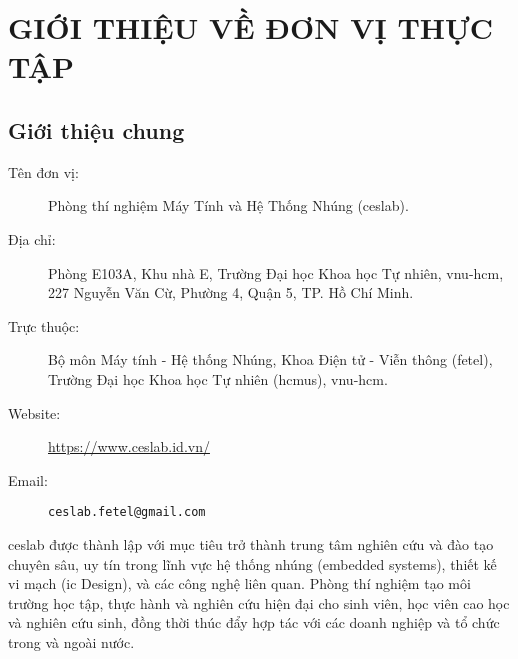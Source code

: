 

\chapter{GIỚI THIỆU VỀ ĐƠN VỊ THỰC TẬP}
\label{Chapter1} %

\section{Giới thiệu chung}
\label{subsec:ceslab_general}

\begin{description}
    \item[Tên đơn vị:] Phòng thí nghiệm Máy Tính và Hệ Thống Nhúng (\acrshort{ceslab}).
    \item[Địa chỉ:] Phòng E103A, Khu nhà E, Trường Đại học Khoa học Tự nhiên, \acrshort{vnu-hcm}, 227 Nguyễn Văn Cừ, Phường 4, Quận 5, TP. Hồ Chí Minh.
    \item[Trực thuộc:] Bộ môn Máy tính - Hệ thống Nhúng, Khoa Điện tử - Viễn thông (\acrshort{fetel}), Trường Đại học Khoa học Tự nhiên (\acrshort{hcmus}), \acrshort{vnu-hcm}.
    \item[Website:] \url{https://www.ceslab.id.vn/}
    \item[Email:] \texttt{ceslab.fetel@gmail.com}
\end{description}

\acrshort{ceslab} được thành lập với mục tiêu trở thành trung tâm nghiên cứu và đào tạo chuyên sâu, uy tín trong lĩnh vực hệ thống nhúng (embedded systems), thiết kế vi mạch (\acrshort{ic} Design), và các công nghệ liên quan. Phòng thí nghiệm tạo môi trường học tập, thực hành và nghiên cứu hiện đại cho sinh viên, học viên cao học và nghiên cứu sinh, đồng thời thúc đẩy hợp tác với các doanh nghiệp và tổ chức trong và ngoài nước.

